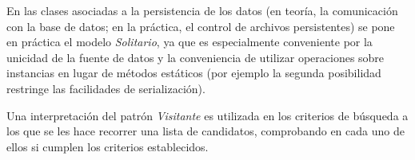 \documentclass[11pt, a4paper, twoside, titlepage]{article}
\begin{document}
		En las clases asociadas a la persistencia de los datos (en teoría, la comunicación con la base de datos; en la práctica, el control de archivos persistentes) se pone en práctica el modelo \textit{Solitario}, ya que es especialmente conveniente por la unicidad de la fuente de datos y la conveniencia de utilizar operaciones sobre instancias en lugar de métodos estáticos (por ejemplo la segunda posibilidad restringe las facilidades de serialización).

		Una interpretación del patrón \textit{Visitante} es utilizada en los criterios de búsqueda a los que se les hace recorrer una lista de candidatos, comprobando en cada uno de ellos si cumplen los criterios establecidos.
\end{document}
